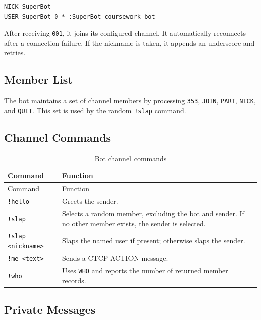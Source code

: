 \documentclass[a4paper,12pt]{article}
\begin{document}
\begin{verbatim}
NICK SuperBot
USER SuperBot 0 * :SuperBot coursework bot
\end{verbatim}

After receiving \texttt{001}, it joins its configured channel. It automatically reconnects after a connection failure. If the nickname is taken, it appends an underscore and retries.

\subsection{Member List}

The bot maintains a set of channel members by processing \texttt{353}, \texttt{JOIN}, \texttt{PART}, \texttt{NICK}, and \texttt{QUIT}. This set is used by the random \texttt{!slap} command.

\subsection{Channel Commands}

\begin{longtable}{p{4cm}p{9cm}}
\caption{Bot channel commands}
\label{tab:botcommands}\\
\toprule
Command & Function \\
\midrule
\endfirsthead

\toprule
Command & Function \\
\midrule
\endhead

\texttt{!hello} & Greets the sender. \\

\texttt{!slap} & Selects a random member, excluding the bot and sender. If no other member exists, the sender is selected. \\

\texttt{!slap <nickname>} & Slaps the named user if present; otherwise slaps the sender. \\

\texttt{!me <text>} & Sends a CTCP ACTION message. \\

\texttt{!who} & Uses \texttt{WHO} and reports the number of returned member records. \\

\bottomrule
\end{longtable}

\subsection{Private Messages}
\end{document}
